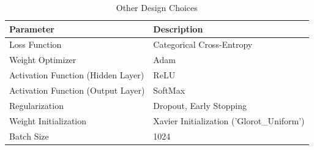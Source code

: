 \documentclass[journal,onecolumn]{IEEEtran}
\begin{document}
\begin{table}[]
\centering
\caption{Other Design Choices}
\label{tab:dnnDesPar}
\begin{tabular}{@{}ll@{}}
\toprule
Parameter                          & Description                               \\ \midrule
Loss Function                      & Categorical Cross-Entropy                 \\
Weight Optimizer                   & Adam                                      \\
Activation Function (Hidden Layer) & ReLU                                      \\
Activation Function (Output Layer) & SoftMax                                   \\
Regularization                     & Dropout, Early Stopping                   \\
Weight Initialization              & Xavier Initialization ('Glorot\_Uniform') \\
Batch Size                         & 1024                                      \\ \bottomrule
\end{tabular}
\end{table}
\end{document}
